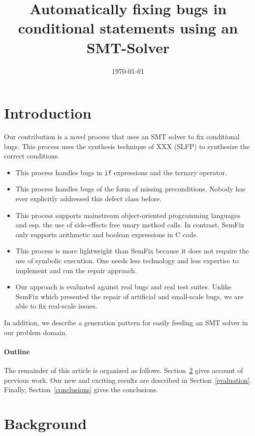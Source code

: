 \documentclass[a4paper,10pt,twocolumn]{article}
\date{\today}
\title{Automatically fixing bugs in conditional statements using an SMT-Solver}
\begin{document}
\maketitle

\begin{abstract}

\end{abstract}

\section{Introduction}

Our contribution is a novel process that uses an SMT solver to fix conditional bugs.
 This process uses the synthesis technique of XXX (SLFP) to synthesize the correct conditions.
\begin{itemize}
 \item This process handles bugs in \texttt{if} expressions and the ternary operator.
 \item This process handles bugs of the form of missing preconditions. Nobody has ever explicitly addressed this defect class before.
 \item This process supports mainstream object-oriented programming languages and esp. the use of side-effects free unary method calls. In contrast, SemFix only supports arithmetic and boolean expressions in C code.
 \item This process is more lightweight than SemFix because it does not require the use of symbolic execution. One needs less technology and less expertise to implement and run the repair approach.
 \item Our approach is evaluated against real bugs and real test suites. Unlike SemFix which presented the repair of artificial and small-scale bugs, we are able to fix real-scale issues.
\end{itemize}

In addition, we describe a generation pattern for easily feeding an SMT solver in our problem domain.

\paragraph{Outline}
The remainder of this article is organized as follows.
Section~\ref{background} gives account of previous work.
Our new and exciting results are described in Section~\ref{evaluation}.
Finally, Section~\ref{conclusions} gives the conclusions.

\section{Background}
\label{background}
\end{document}
